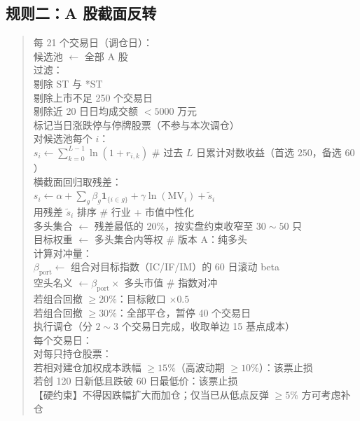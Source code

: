 \subsection{规则二：A 股截面反转}

\begin{quote}\ttfamily\small
每 21 个交易日（调仓日）：\\[2pt]
\quad 候选池 $\gets$ 全部 A 股\\[2pt]
\quad 过滤：\\

\qquad 剔除 ST 与 *ST\\
\qquad 剔除上市不足 250 个交易日\\
\qquad 剔除近 20 日日均成交额 $<5000$ 万元\\
\qquad 标记当日涨跌停与停牌股票（不参与本次调仓）\\[2pt]
\quad 对候选池每个 $i$：\\
\qquad $s_i \gets \sum_{k=0}^{L-1}\ln(1+r_{i,k})$ \hfill \# 过去 $L$ 日累计对数收益（首选 $250$，备选 $60$）\\[2pt]
\quad 横截面回归取残差：\\
\qquad $s_i \gets \alpha+\sum_g\beta_g\mathbf 1_{\{i\in g\}}+\gamma\ln(\mathrm{MV}_i)+\tilde s_i$\\
\qquad 用残差 $\tilde s_i$ 排序 \hfill \# 行业 + 市值中性化\\[2pt]
\quad 多头集合 $\gets$ 残差最低的 20\%，按实盘约束收窄至 $30\sim50$ 只\\
\quad 目标权重 $\gets$ 多头集合内等权 \hfill \# 版本 A：纯多头\\[2pt]
\quad 计算对冲量：\\
\qquad $\beta_{\text{port}} \gets$ 组合对目标指数（IC/IF/IM）的 60 日滚动 beta\\
\qquad 空头名义 $\gets \beta_{\text{port}}\times$ 多头市值 \hfill \# 指数对冲\\[2pt]
\quad 若组合回撤 $\ge20\%$：目标敞口 $\times0.5$\\
\quad 若组合回撤 $\ge30\%$：全部平仓，暂停 40 个交易日\\[2pt]
\quad 执行调仓（分 $2\sim3$ 个交易日完成，收取单边 15 基点成本）\\[2pt]
每个交易日：\\
\quad 对每只持仓股票：\\
\qquad 若相对建仓加权成本跌幅 $\ge15\%$（高波动期 $\ge10\%$）：该票止损\\
\qquad 若创 120 日新低且跌破 60 日最低价：该票止损\\
\qquad 【硬约束】不得因跌幅扩大而加仓；仅当已从低点反弹 $\ge5\%$ 方可考虑补仓
\end{quote}

